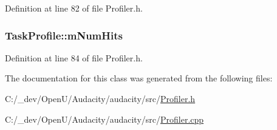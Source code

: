 Definition at line 82 of file Profiler.\+h.

\subsubsection[{\texorpdfstring{m\+Num\+Hits}{mNumHits}}]{ Task\+Profile\+::m\+Num\+Hits}\hypertarget{class_task_profile_a3b6a21de67583a1089e3935a8aca3d28}{}\label{class_task_profile_a3b6a21de67583a1089e3935a8aca3d28}


Definition at line 84 of file Profiler.\+h.



The documentation for this class was generated from the following files\+:\begin{DoxyCompactItemize}
\item 
C\+:/\+\_\+dev/\+Open\+U/\+Audacity/audacity/src/\hyperlink{_profiler_8h}{Profiler.\+h}\item 
C\+:/\+\_\+dev/\+Open\+U/\+Audacity/audacity/src/\hyperlink{_profiler_8cpp}{Profiler.\+cpp}\end{DoxyCompactItemize}
